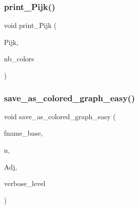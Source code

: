 \subsubsection{\texorpdfstring{print\+\_\+\+Pijk()}{print\_Pijk()}}
{\footnotesize\ttfamily void print\+\_\+\+Pijk (\begin{DoxyParamCaption}\item[{\mbox{\hyperlink{galois_8h_a09fddde158a3a20bd2dcadb609de11dc}{I\+NT}} $\ast$}]{Pijk,  }\item[{\mbox{\hyperlink{galois_8h_a09fddde158a3a20bd2dcadb609de11dc}{I\+NT}}}]{nb\+\_\+colors }\end{DoxyParamCaption})}

\mbox{\label{galois__global_8_c_aaa3f21e2269dffac458ed52783c772ff}} 
\subsubsection{\texorpdfstring{save\+\_\+as\+\_\+colored\+\_\+graph\+\_\+easy()}{save\_as\_colored\_graph\_easy()}}
{\footnotesize\ttfamily void save\+\_\+as\+\_\+colored\+\_\+graph\+\_\+easy (\begin{DoxyParamCaption}\item[{const \mbox{\hyperlink{galois_8h_ab6cc7b4aeb6ea31aba2b3fbfc83ff5e6}{B\+Y\+TE}} $\ast$}]{fname\+\_\+base,  }\item[{\mbox{\hyperlink{galois_8h_a09fddde158a3a20bd2dcadb609de11dc}{I\+NT}}}]{n,  }\item[{\mbox{\hyperlink{galois_8h_a09fddde158a3a20bd2dcadb609de11dc}{I\+NT}} $\ast$}]{Adj,  }\item[{\mbox{\hyperlink{galois_8h_a09fddde158a3a20bd2dcadb609de11dc}{I\+NT}}}]{verbose\+\_\+level }\end{DoxyParamCaption})}

\mbox{\label{galois__global_8_c_a1f2e1a9df5b1f9af96c9c1e08fbc98c7}} 
